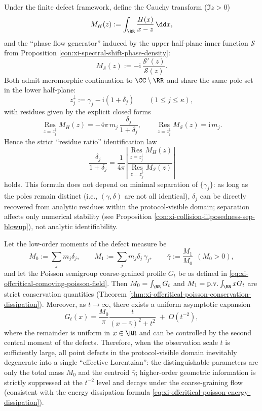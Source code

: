 \begin{proposition}\label{con:xi-double-residue-ratio-delta}
Under the finite defect framework, define the Cauchy transform (\(\Im z>0\))
\[
M_H(z):=\int_{\RR}\frac{H(x)}{x-z}\,\dd x,
\]
and the ``phase flow generator'' induced by the upper half-plane inner function \(\mathcal{S}\) from Proposition \ref{con:xi-spectral-shift-phase-density}:
\[
M_{\mathcal{S}}(z):=-\mathrm{i}\,\frac{\mathcal{S}'(z)}{\mathcal{S}(z)}.
\]
Both admit meromorphic continuation to \(\CC\setminus\RR\) and share the same pole set in the lower half-plane:
\[
z_j^{\downarrow}:=\gamma_j-\mathrm{i}(1+\delta_j)\qquad(1\le j\le \kappa),
\]
with residues given by the explicit closed forms
\[
\operatorname*{Res}_{z=z_j^{\downarrow}}M_H(z)
=-4\pi\,m_j\,\frac{\delta_j}{1+\delta_j},
\qquad
\operatorname*{Res}_{z=z_j^{\downarrow}}M_{\mathcal{S}}(z)
=\mathrm{i}\,m_j.
\]
Hence the strict ``residue ratio'' identification law
\[
\boxed{\;
\frac{\delta_j}{1+\delta_j}
=
\frac{1}{4\pi}\left|
\frac{\operatorname*{Res}_{z=z_j^{\downarrow}}M_H(z)}
{\operatorname*{Res}_{z=z_j^{\downarrow}}M_{\mathcal{S}}(z)}
\right|\;}
\]
holds. This formula does not depend on minimal separation of \(\{\gamma_j\}\): as long as the poles remain distinct (i.e., \((\gamma,\delta)\) are not all identical), \(\delta_j\) can be directly recovered from analytic residues within the protocol-visible domain; separation affects only numerical stability (see Proposition \ref{con:xi-collision-illposedness-sep-blowup}), not analytic identifiability.
\end{proposition}

\begin{proposition}\label{con:xi-poisson-coarsegraining-nohair}
Let the low-order moments of the defect measure be
\[
M_0:=\sum_{j}m_j\delta_j,
\qquad
M_1:=\sum_{j}m_j\delta_j\,\gamma_j,
\qquad
\bar\gamma:=\frac{M_1}{M_0}\ \ (M_0>0),
\]
and let the Poisson semigroup coarse-grained profile \(G_t\) be as defined in \eqref{eq:xi-offcritical-comoving-poisson-field}.
Then \(M_0=\int_{\RR}G_t\) and \(M_1=\mathrm{p.v.}\int_{\RR}xG_t\) are strict conservation quantities (Theorem \ref{thm:xi-offcritical-poisson-conservation-dissipation}).
Moreover, as \(t\to\infty\), there exists a uniform asymptotic expansion
\[
G_t(x)
=
\frac{M_0}{\pi}\frac{t}{(x-\bar\gamma)^2+t^2}
\;+\;O(t^{-2}),
\]
where the remainder is uniform in \(x\in\RR\) and can be controlled by the second central moment of the defects.
Therefore, when the observation scale \(t\) is sufficiently large, all point defects in the protocol-visible domain inevitably degenerate into a single ``effective Lorentzian'': the distinguishable parameters are only the total mass \(M_0\) and the centroid \(\bar\gamma\); higher-order geometric information is strictly suppressed at the \(t^{-2}\) level and decays under the coarse-graining flow (consistent with the energy dissipation formula \eqref{eq:xi-offcritical-poisson-energy-dissipation}).
\end{proposition}


